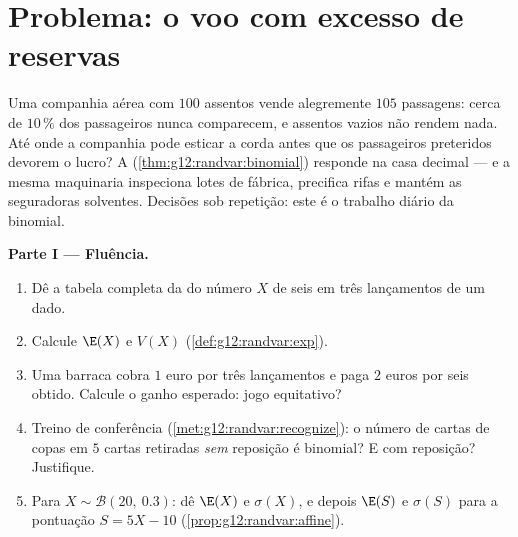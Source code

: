 \section{Problema: o voo com excesso de reservas}

\begin{problem}
\label{pb:g12:randvar:1}
Uma companhia aérea com $100$ assentos vende alegremente $105$
passagens: cerca de $10\,\%$ dos passageiros nunca comparecem, e
assentos vazios não rendem nada. Até onde a companhia pode
esticar a corda antes que os passageiros preteridos devorem o
lucro? A 
(\cref{thm:g12:randvar:binomial}) responde na casa decimal --- e
a mesma maquinaria inspeciona lotes de fábrica, precifica rifas
e mantém as seguradoras solventes. Decisões sob repetição: este
é o trabalho diário da binomial.

\medskip
\noindent\textbf{Parte I --- Fluência.}
\begin{enumerate}
  \item Dê a tabela completa da  do número $X$ de
        seis em três lançamentos de um dado.
  \item Calcule $\E(X)$ e $V(X)$
        (\cref{def:g12:randvar:exp}).
  \item Uma barraca cobra $1$ euro por três lançamentos e paga
        $2$ euros por seis obtido. Calcule o ganho esperado:
        jogo equitativo?
  \item Treino de conferência (\cref{met:g12:randvar:recognize}):
        o número de cartas de copas em $5$ cartas retiradas
        \emph{sem} reposição é binomial? E com reposição?
        Justifique.
  \item Para $X \sim \mathcal B(20,\ 0.3)$: dê $\E(X)$ e
        $\sigma(X)$, e depois $\E(S)$ e $\sigma(S)$ para a
        pontuação $S = 5X - 10$
        (\cref{prop:g12:randvar:affine}).
\end{enumerate}


\end{problem}
